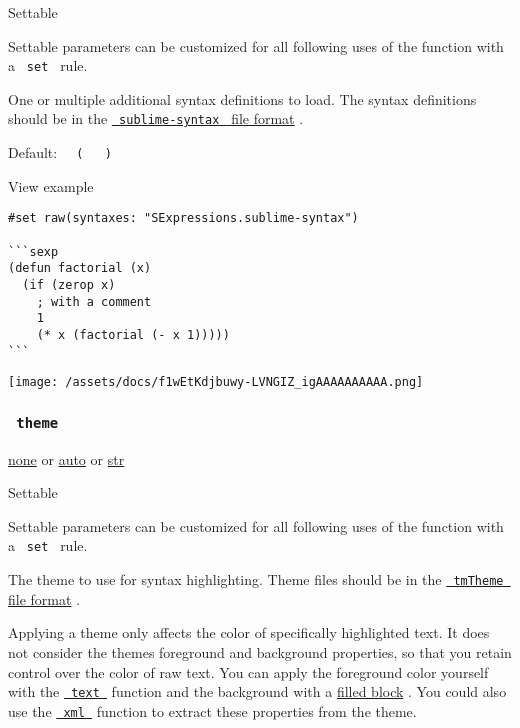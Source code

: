 {{ Settable }}

\label{parameters-syntaxes-settable-tooltip}
Settable parameters can be customized for all following uses of the
function with a \texttt{\ set\ } rule.

One or multiple additional syntax definitions to load. The syntax
definitions should be in the
\href{https://www.sublimetext.com/docs/syntax.html}{\texttt{\ sublime-syntax\ }
file format} .

Default:
\texttt{\ }{\texttt{\ (\ }}\texttt{\ }{\texttt{\ )\ }}\texttt{\ }


View example

\begin{verbatim}
#set raw(syntaxes: "SExpressions.sublime-syntax")

```sexp
(defun factorial (x)
  (if (zerop x)
    ; with a comment
    1
    (* x (factorial (- x 1)))))
```
\end{verbatim}

\texttt{[image: /assets/docs/f1wEtKdjbuwy-LVNGIZ\_igAAAAAAAAAA.png]}

\subsubsection{\texorpdfstring{\texttt{\ theme\ }}{ theme }}\label{parameters-theme}

\href{/docs/reference/foundations/none/}{none} {or}
\href{/docs/reference/foundations/auto/}{auto} {or}
\href{/docs/reference/foundations/str/}{str}

{{ Settable }}

\label{parameters-theme-settable-tooltip}
Settable parameters can be customized for all following uses of the
function with a \texttt{\ set\ } rule.

The theme to use for syntax highlighting. Theme files should be in the
\href{https://www.sublimetext.com/docs/color_schemes_tmtheme.html}{\texttt{\ tmTheme\ }
file format} .

Applying a theme only affects the color of specifically highlighted
text. It does not consider the theme\textquotesingle s foreground and
background properties, so that you retain control over the color of raw
text. You can apply the foreground color yourself with the
\href{/docs/reference/text/text/}{\texttt{\ text\ }} function and the
background with a
\href{/docs/reference/layout/block/\#parameters-fill}{filled block} .
You could also use the
\href{/docs/reference/data-loading/xml/}{\texttt{\ xml\ }} function to
extract these properties from the theme.

